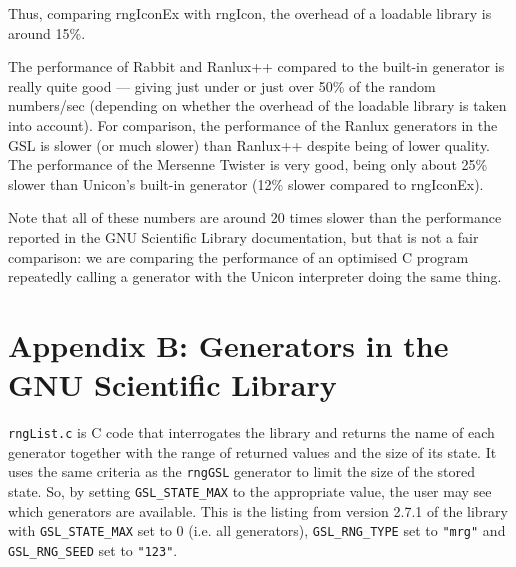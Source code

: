 \documentclass[letterpaper,12pt]{article}
\begin{document}
Thus, comparing {\sf rngIconEx} with {\sf rngIcon}, the overhead of a loadable library
is around 15\%.

The performance of Rabbit and Ranlux++ compared to the built-in generator is really quite
good --- giving just under or just over 50\% of the random numbers/sec (depending on
whether the overhead of the loadable library is taken into account). For comparison, the
performance of the Ranlux generators in the GSL is slower (or much slower) than Ranlux++
despite being of lower quality. The performance of the Mersenne Twister is very good,
being only about 25\% slower than Unicon's built-in generator (12\% slower compared to
{\sf rngIconEx}).

Note that all of these numbers are around 20 times slower than the performance reported in
the GNU Scientific Library documentation, but that is not a fair comparison: we are
comparing the performance of an optimised C program repeatedly calling a generator with
the Unicon interpreter doing the same thing.

\pagebreak
\section*{Appendix B: Generators in the GNU Scientific Library}
\texttt{rngList.c} is C code that interrogates the library and returns the name of each
generator together with the range of returned values and the size of its state. It uses
the same criteria as the \texttt{rngGSL} generator to limit the size of the stored
state. So, by setting \texttt{GSL\_STATE\_MAX} to the appropriate value, the user may
see which generators are available. This is the listing from version 2.7.1 of the
library with \texttt{GSL\_STATE\_MAX} set to 0 (i.e. all generators),
\texttt{GSL\_RNG\_TYPE} set to \texttt{"mrg"} and
\texttt{GSL\_RNG\_SEED} set to \texttt{"123"}.
    
\end{document}
